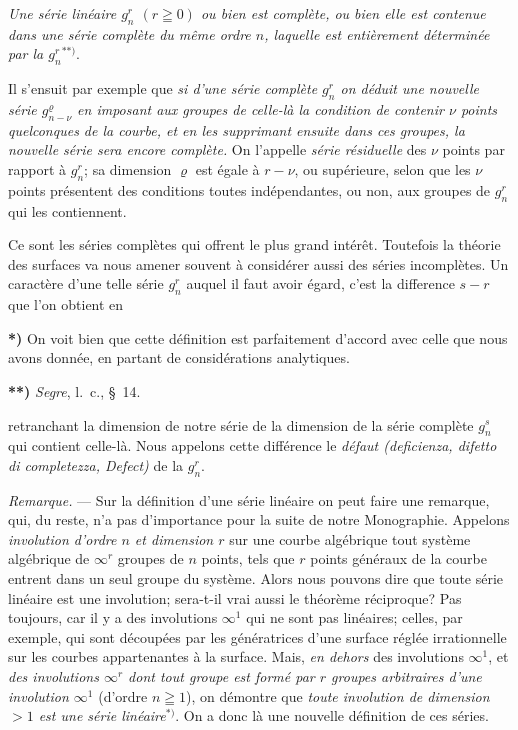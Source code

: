 \documentclass{article}
\begin{document}
\emph{Une série linéaire $g_{n}^{r}$ $(r \geqq 0)$ ou bien est complète, ou bien elle est contenue dans une série complète du même ordre $n$, laquelle est entièrement déterminée par la $g_{n}^{r}$}${}^{**)}$.

Il s'ensuit par exemple que \emph{si d'une série complète $g_{n}^{r}$ on déduit une nouvelle série $g_{n-\nu}^{\varrho}$ en imposant aux groupes de celle-là la condition de contenir $\nu$ points quelconques de la courbe, et en les supprimant ensuite dans ces groupes, la nouvelle série sera encore complète.} On l'appelle \emph{série résiduelle} des $\nu$ points par rapport à $g_{n}^{r}$; sa dimension $\varrho$ est égale à $r - \nu$, ou supérieure, selon que les $\nu$ points présentent des conditions toutes indépendantes, ou non, aux groupes de $g_{n}^{r}$ qui les contiennent.

Ce sont les séries complètes qui offrent le plus grand intérêt. Toutefois la théorie des surfaces va nous amener souvent à considérer aussi des séries incomplètes. Un caractère d'une telle série $g_{n}^{r}$ auquel il faut avoir égard, c'est la difference $s - r$ que l'on obtient en

\textbf{*)} On voit bien que cette définition est parfaitement d'accord avec celle que nous avons donnée, en partant de considérations analytiques.

\textbf{**)} \emph{Segre}, l.\ c., §~14.

retranchant la dimension de notre série de la dimension de la série complète $g_{n}^{s}$ qui contient celle-là. Nous appelons cette différence le \emph{défaut (deficienza, difetto di completezza, Defect)} de la $g_{n}^{r}$.

\emph{Remarque.} --- Sur la définition d'une série linéaire on peut faire une remarque, qui, du reste, n'a pas d'importance pour la suite de notre Monographie. Appelons \emph{involution d'ordre $n$ et dimension $r$} sur une courbe algébrique tout système algébrique de $\infty^{r}$ groupes de $n$ points, tels que $r$ points généraux de la courbe entrent dans un seul groupe du système. Alors nous pouvons dire que toute série linéaire est une involution; sera-t-il vrai aussi le théorème réciproque? Pas toujours, car il y a des involutions $\infty^{1}$ qui ne sont pas linéaires; celles, par exemple, qui sont découpées par les génératrices d'une surface réglée irrationnelle sur les courbes appartenantes à la surface. Mais, \emph{en dehors} des involutions $\infty^{1}$, et \emph{des involutions $\infty^{r}$ dont tout groupe est formé par $r$ groupes arbitraires d'une involution $\infty^{1}$} (d'ordre $n \geqq 1$), on démontre que \emph{toute involution de dimension $> 1$ est une série linéaire}${}^{*)}$. On a donc là une nouvelle définition de ces séries.
\end{document}

